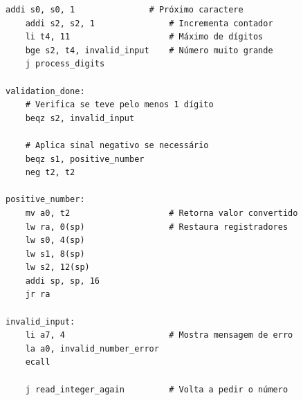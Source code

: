 \documentclass[12pt]{article}
\begin{document}
\begin{lstlisting}[language={[x86masm]Assembler}, caption=Leitura e validação de números completos]
    addi s0, s0, 1               # Próximo caractere
    addi s2, s2, 1               # Incrementa contador
    li t4, 11                    # Máximo de dígitos
    bge s2, t4, invalid_input    # Número muito grande
    j process_digits

validation_done:
    # Verifica se teve pelo menos 1 dígito
    beqz s2, invalid_input

    # Aplica sinal negativo se necessário
    beqz s1, positive_number
    neg t2, t2

positive_number:
    mv a0, t2                    # Retorna valor convertido
    lw ra, 0(sp)                 # Restaura registradores
    lw s0, 4(sp)
    lw s1, 8(sp)
    lw s2, 12(sp)
    addi sp, sp, 16
    jr ra

invalid_input:
    li a7, 4                     # Mostra mensagem de erro
    la a0, invalid_number_error
    ecall

    j read_integer_again         # Volta a pedir o número
\end{lstlisting}
\end{document}
